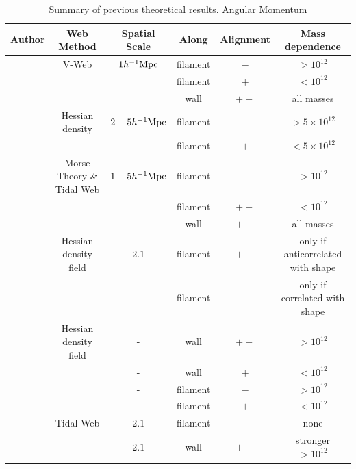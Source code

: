 \documentclass[usenatbib]{mn2e}
\newcommand{\hMpc}{{\ifmmode{h^{-1}{\rm Mpc}}\else{$h^{-1}$Mpc }\fi}}
\newcommand{\hMsun}{{\ifmmode{h^{-1}{\rm {M_{\odot}}}}\else{$h^{-1}{\rm{M_{\odot}}}$}\fi}}
\begin{document}
\begin{table}
\begin{tabular}{cccccc}\hline\hline
Author & Web Method & Spatial Scale & Along &
Alignment & Mass dependence\\\hline


\cite{Libeskind2013} & V-Web & $1 \hMpc$ & 
filament &$-$ & $>10^{12}$\hMsun\\

&   & & 
filament &$+$ & $<10^{12}$\hMsun\\

&   & & 
wall & $++$ & all masses\\

\cite{Trowland2013} & Hessian density & $2-5\hMpc$ & 
filament & $-$ & $> 5\times 10^{12}$\hMsun\\
&   & & 
filament & $+$ & $< 5\times 10^{12}$\hMsun\\

\cite{Codis2012} & Morse Theory \& Tidal Web & $1-5\hMpc$ & 
filament & $--$ & $>10^{12}$\hMsun \\ 

&   & & 
filament & $++$ & $<10^{12}$\hMsun \\ 

& & & 
wall & $++$ & all masses\\

\cite{Zhang2009}  & Hessian density field &  $2.1$\hMpc & 
filament & $++$ & only if anticorrelated with shape\\

& &  & 
filament & $--$ & only if correlated with shape\\

\cite{AragonCalvo2007} & Hessian density field & - &
wall & $++$ & $>10^{12}$\hMsun\\


& & - &
wall & $+$ & $<10^{12}$\hMsun\\

& & - &
filament& $-$ & $>10^{12}$\hMsun\\


& & - &
filament& $+$ & $<10^{12}$\hMsun\\



\cite{Hahn2007} & Tidal Web & $2.1$\hMpc & filament & $-$& none\\


& &  $2.1$\hMpc &
wall & $++$ & stronger $>10^{12}$\hMsun\\\hline \hline

\end{tabular}
\caption{Summary of previous theoretical results.
Angular Momentum}
\end{table}
\end{document}
